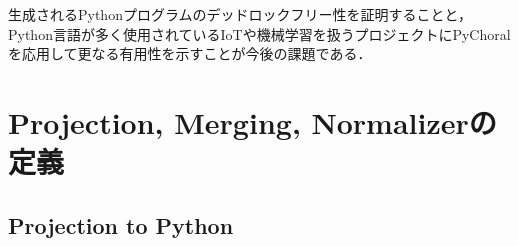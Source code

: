 \documentclass{thesis}
\begin{document}
生成されるPythonプログラムのデッドロックフリー性を証明することと，Python言語が多く使用されているIoTや機械学習を扱うプロジェクトにPyChoralを応用して更なる有用性を示すことが今後の課題である．




\appendix

\chapter{Projection, Merging, Normalizerの定義}
\section{Projection to Python}
\end{document}
